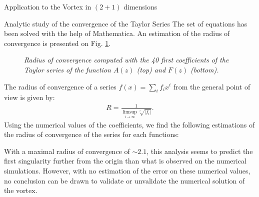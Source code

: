 \begin{section}{Application to the Vortex in $(2+1)$ dimensions}
\begin{subsection}{Analytic study of the convergence of the Taylor Series}
    The set of equations has been solved with the help of
    Mathematica. An estimation of the radius of convergence is
    presented on Fig. \ref{fig:coeff}.
    \begin{figure}[ht!]
      \begin{center}
        
        
        \caption{\em Radius of convergence computed with the 40 first
          coefficients of the Taylor series of the function $A(z)$
          (top) and $F(z)$ (bottom).}
        \label{fig:coeff}
      \end{center}
    \end{figure}
    The radius of convergence of a series $f(x) = \sum_i f_ix^i$ from
    the general point of view is given by:
    \begin{align}
      R = \frac{1}{\limsup_{i\to\infty}\sqrt[i]{|f_i|}}.
    \end{align}
    Using the numerical values of the coefficients, we find the
    following estimations of the radius of convergence of the series
    for each functions:
    \vspace{18pt}
    {
      \center
      \hfill{}\hfill
      \vspace{18pt}
    }

    With a maximal radius of convergence of $\sim 2.1$, this analysis
    seems to predict the first singularity further from the origin
    than what is observed on the numerical simulations.  However, with
    no estimation of the error on these numerical values, no
    conclusion can be drawn to validate or unvalidate the numerical
    solution of the vortex.
  \end{subsection}
\end{section}

